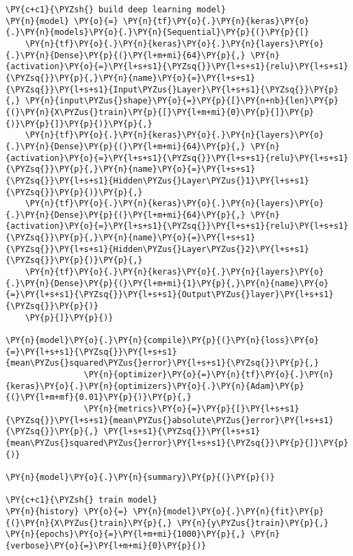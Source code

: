 \begin{tcolorbox}[breakable, size=fbox, boxrule=1pt, pad at break*=1mm,colback=cellbackground, colframe=cellborder]
\begin{Verbatim}[commandchars=\\\{\}]
\PY{c+c1}{\PYZsh{} build deep learning model}
\PY{n}{model} \PY{o}{=} \PY{n}{tf}\PY{o}{.}\PY{n}{keras}\PY{o}{.}\PY{n}{models}\PY{o}{.}\PY{n}{Sequential}\PY{p}{(}\PY{p}{[}
    \PY{n}{tf}\PY{o}{.}\PY{n}{keras}\PY{o}{.}\PY{n}{layers}\PY{o}{.}\PY{n}{Dense}\PY{p}{(}\PY{l+m+mi}{64}\PY{p}{,} \PY{n}{activation}\PY{o}{=}\PY{l+s+s1}{\PYZsq{}}\PY{l+s+s1}{relu}\PY{l+s+s1}{\PYZsq{}}\PY{p}{,}\PY{n}{name}\PY{o}{=}\PY{l+s+s1}{\PYZsq{}}\PY{l+s+s1}{Input\PYZus{}Layer}\PY{l+s+s1}{\PYZsq{}}\PY{p}{,} \PY{n}{input\PYZus{}shape}\PY{o}{=}\PY{p}{[}\PY{n+nb}{len}\PY{p}{(}\PY{n}{X\PYZus{}train}\PY{p}{[}\PY{l+m+mi}{0}\PY{p}{]}\PY{p}{)}\PY{p}{]}\PY{p}{)}\PY{p}{,}
    \PY{n}{tf}\PY{o}{.}\PY{n}{keras}\PY{o}{.}\PY{n}{layers}\PY{o}{.}\PY{n}{Dense}\PY{p}{(}\PY{l+m+mi}{64}\PY{p}{,} \PY{n}{activation}\PY{o}{=}\PY{l+s+s1}{\PYZsq{}}\PY{l+s+s1}{relu}\PY{l+s+s1}{\PYZsq{}}\PY{p}{,}\PY{n}{name}\PY{o}{=}\PY{l+s+s1}{\PYZsq{}}\PY{l+s+s1}{Hidden\PYZus{}Layer\PYZus{}1}\PY{l+s+s1}{\PYZsq{}}\PY{p}{)}\PY{p}{,}
    \PY{n}{tf}\PY{o}{.}\PY{n}{keras}\PY{o}{.}\PY{n}{layers}\PY{o}{.}\PY{n}{Dense}\PY{p}{(}\PY{l+m+mi}{64}\PY{p}{,} \PY{n}{activation}\PY{o}{=}\PY{l+s+s1}{\PYZsq{}}\PY{l+s+s1}{relu}\PY{l+s+s1}{\PYZsq{}}\PY{p}{,}\PY{n}{name}\PY{o}{=}\PY{l+s+s1}{\PYZsq{}}\PY{l+s+s1}{Hidden\PYZus{}Layer\PYZus{}2}\PY{l+s+s1}{\PYZsq{}}\PY{p}{)}\PY{p}{,}
    \PY{n}{tf}\PY{o}{.}\PY{n}{keras}\PY{o}{.}\PY{n}{layers}\PY{o}{.}\PY{n}{Dense}\PY{p}{(}\PY{l+m+mi}{1}\PY{p}{,}\PY{n}{name}\PY{o}{=}\PY{l+s+s1}{\PYZsq{}}\PY{l+s+s1}{Output\PYZus{}layer}\PY{l+s+s1}{\PYZsq{}}\PY{p}{)}
    \PY{p}{]}\PY{p}{)}

\PY{n}{model}\PY{o}{.}\PY{n}{compile}\PY{p}{(}\PY{n}{loss}\PY{o}{=}\PY{l+s+s1}{\PYZsq{}}\PY{l+s+s1}{mean\PYZus{}squared\PYZus{}error}\PY{l+s+s1}{\PYZsq{}}\PY{p}{,}
                \PY{n}{optimizer}\PY{o}{=}\PY{n}{tf}\PY{o}{.}\PY{n}{keras}\PY{o}{.}\PY{n}{optimizers}\PY{o}{.}\PY{n}{Adam}\PY{p}{(}\PY{l+m+mf}{0.01}\PY{p}{)}\PY{p}{,}
                \PY{n}{metrics}\PY{o}{=}\PY{p}{[}\PY{l+s+s1}{\PYZsq{}}\PY{l+s+s1}{mean\PYZus{}absolute\PYZus{}error}\PY{l+s+s1}{\PYZsq{}}\PY{p}{,} \PY{l+s+s1}{\PYZsq{}}\PY{l+s+s1}{mean\PYZus{}squared\PYZus{}error}\PY{l+s+s1}{\PYZsq{}}\PY{p}{]}\PY{p}{)}

\PY{n}{model}\PY{o}{.}\PY{n}{summary}\PY{p}{(}\PY{p}{)}

\PY{c+c1}{\PYZsh{} train model}
\PY{n}{history} \PY{o}{=} \PY{n}{model}\PY{o}{.}\PY{n}{fit}\PY{p}{(}\PY{n}{X\PYZus{}train}\PY{p}{,} \PY{n}{y\PYZus{}train}\PY{p}{,} \PY{n}{epochs}\PY{o}{=}\PY{l+m+mi}{1000}\PY{p}{,} \PY{n}{verbose}\PY{o}{=}\PY{l+m+mi}{0}\PY{p}{)}


\end{Verbatim}
\end{tcolorbox}
